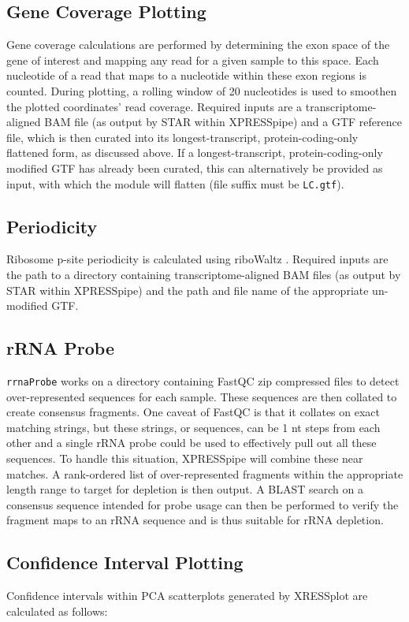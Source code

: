 \documentclass[10pt, oneside]{article}
\begin{document}
\begin{multicols}{2}
\subsection*{Gene Coverage Plotting}
Gene coverage calculations are performed by determining the exon space of the gene of interest and mapping any read for a given sample to this space. Each nucleotide of a read that maps to a nucleotide within these exon regions is counted. During plotting, a rolling window of 20 nucleotides is used to smoothen the plotted coordinates' read coverage. Required inputs are a transcriptome-aligned BAM file (as output by STAR within XPRESSpipe) and a GTF reference file, which is then curated into its longest-transcript, protein-coding-only flattened form, as discussed above. If a longest-transcript, protein-coding-only modified GTF has already been curated, this can alternatively be provided as input, with which the module will flatten (file suffix must be \texttt{LC.gtf}).

\subsection*{Periodicity}
Ribosome p-site periodicity is calculated using riboWaltz \cite{ribowaltz}. Required inputs are the path to a directory containing transcriptome-aligned BAM files (as output by STAR within XPRESSpipe) and the path and file name of the appropriate un-modified GTF.

\subsection*{rRNA Probe}
\texttt{rrnaProbe} works on a directory containing FastQC \cite{fastqc} zip compressed files to detect over-represented sequences for each sample. These sequences are then collated to create consensus fragments. One caveat of FastQC is that it collates on exact matching strings, but these strings, or sequences, can be 1 nt steps from each other and a single rRNA probe could be used to effectively pull out all these sequences. To handle this situation, XPRESSpipe will combine these near matches. A rank-ordered list of over-represented fragments within the appropriate length range to target for depletion is then output. A BLAST \cite{blast} search on a consensus sequence intended for probe usage can then be performed to verify the fragment maps to an rRNA sequence and is thus suitable for rRNA depletion.

\subsection*{Confidence Interval Plotting}
Confidence intervals within PCA scatterplots generated by XRESSplot are calculated as follows:


\end{multicols}
\end{document}

